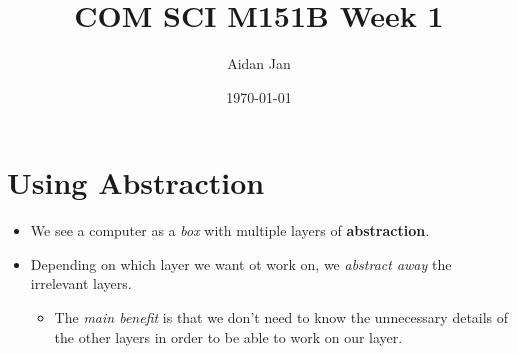 \documentclass[10pt]{article}
\title{COM SCI M151B Week 1}
\author{Aidan Jan}
\date{\today}
\begin{document}
\maketitle
\section*{Using Abstraction}
\begin{itemize}
    \item We see a computer as a \textit{box} with multiple layers of \textbf{abstraction}.
    \item Depending on which layer we want ot work on, we \textit{abstract away} the irrelevant layers.
    \begin{itemize}
        \item The \textit{main benefit} is that we don't need to know the unnecessary details of the other layers in order to be able to work on our layer.
    \end{itemize}
\end{itemize}
\end{document}
